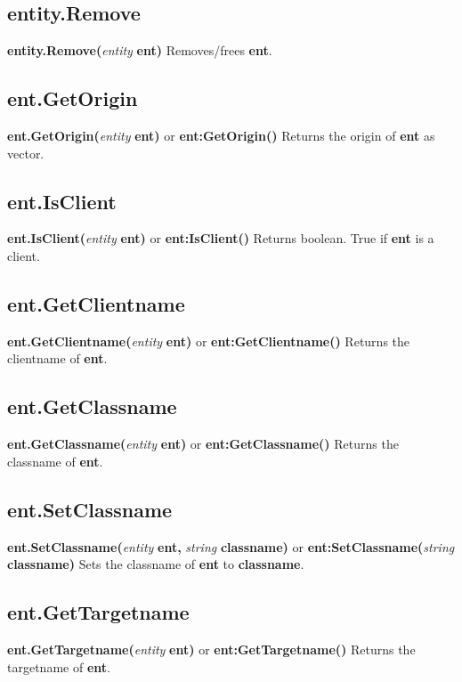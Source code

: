 \documentclass{scrreprt}
\begin{document}
\subsection{entity.Remove}
\label{enty-remove}
\textbf{entity.Remove(}\textit{entity}\textbf{ ent)}
\newline
Removes/frees \textbf{ent}.
\subsection{ent.GetOrigin}
\label{enty-getorigin}
\textbf{ent.GetOrigin(}\textit{entity}\textbf{ ent)} or \textbf{ent:GetOrigin()}
\newline
Returns the origin of \textbf{ent} as vector.
\subsection{ent.IsClient}
\label{enty-isclient}
\textbf{ent.IsClient(}\textit{entity}\textbf{ ent)} or \textbf{ent:IsClient()}
\newline
Returns boolean. True if \textbf{ent} is a client.
\subsection{ent.GetClientname}
\label{enty-getclientname}
\textbf{ent.GetClientname(}\textit{entity}\textbf{ ent)} or \textbf{ent:GetClientname()}
\newline
Returns the clientname of \textbf{ent}.
\subsection{ent.GetClassname}
\label{enty-getclassname}
\textbf{ent.GetClassname(}\textit{entity}\textbf{ ent)} or \textbf{ent:GetClassname()}
\newline
Returns the classname of \textbf{ent}.
\subsection{ent.SetClassname}
\label{enty-setclassname}
\textbf{ent.SetClassname(}\textit{entity}\textbf{ ent, }\textit{string}\textbf{ classname)} or 
\newline
\textbf{ent:SetClassname(}\textit{string}\textbf{ classname)}
\newline
Sets the classname of \textbf{ent} to \textbf{classname}.
\subsection{ent.GetTargetname}
\label{enty-gettargetname}
\textbf{ent.GetTargetname(}\textit{entity}\textbf{ ent)} or \textbf{ent:GetTargetname()}
\newline
Returns the targetname of \textbf{ent}.
\end{document}
